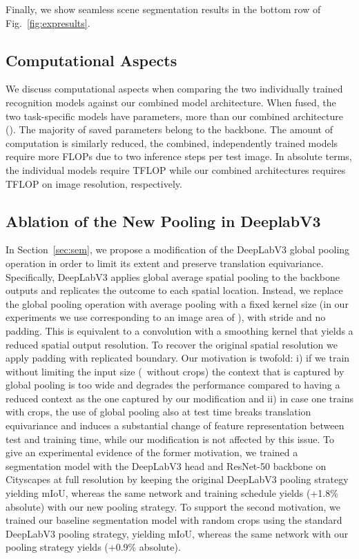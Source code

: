 \documentclass[10pt,twocolumn,letterpaper]{article}
\begin{document}
Finally, we show seamless scene segmentation results in the bottom row of Fig.~\ref{fig:expresults}.












\subsection{Computational Aspects}
\label{ssec:computational}
We discuss computational aspects when comparing the two individually trained recognition models against our combined model architecture. 
When fused, the two task-specific models have  parameters, \ie \mbox{} more than our combined architecture (\mbox{}). The majority of saved parameters belong to the backbone. The amount of computation is similarly reduced, \ie the combined, independently trained models require  more FLOPs due to two inference steps per test image. In absolute terms, the individual models require  TFLOP while our combined architectures requires  TFLOP on  image resolution, respectively.

\subsection{Ablation of the New Pooling in DeeplabV3}
In Section~\ref{sec:sem}, we propose a modification of the DeepLabV3 global pooling operation in order to limit its extent and preserve translation equivariance. Specifically, DeepLabV3 applies global average spatial pooling to the backbone outputs and replicates the outcome to each spatial location. Instead, we replace the global pooling operation with average pooling with a fixed kernel size (in our experiments we use  corresponding to an image area of ), with stride  and no padding. This is equivalent to a convolution with a smoothing kernel that yields a reduced spatial output resolution. To recover the original spatial resolution we apply padding with replicated boundary. Our motivation is twofold: i) if we train without limiting the input size (\ie~without crops) the context that is captured by global pooling is too wide and degrades the performance compared to having a reduced context as the one captured by our modification and ii) in case one trains with crops, the use of global pooling also at test time breaks translation equivariance and induces a substantial change of feature representation between test and training time, while our modification is not affected by this issue.
To give an experimental evidence of the former motivation, we trained a segmentation model with the DeepLabV3 head and ResNet-50 backbone on Cityscapes at full resolution by keeping the original DeepLabV3 pooling strategy yielding  mIoU, whereas the same network and training schedule yields  (+1.8\% absolute) with our new pooling strategy. To support the second motivation, we trained our baseline segmentation model with random  crops using the standard DeepLabV3 pooling strategy, yielding  mIoU, whereas the same network with our pooling strategy yields  (+0.9\% absolute).
\end{document}
